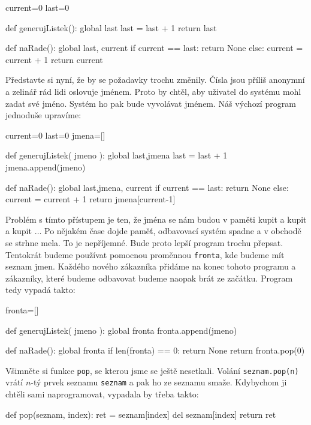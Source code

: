 \begin{python}
current=0
last=0

def generujListek():
    global last
    last = last + 1
    return last
    
def naRade():
    global last, current
    if current == last:
        return None
    else:
        current = current + 1
    return current
\end{python}

Představte si nyní, že by se požadavky trochu změnily. Čísla jsou příliš anonymní a zelinář rád lidi oslovuje jménem. Proto by chtěl,
aby uživatel do systému mohl zadat své jméno. Systém ho pak bude vyvolávat jménem. Náš výchozí program jednoduše upravíme:

\begin{python}
current=0
last=0
jmena=[]

def generujListek( jmeno ):
    global last,jmena
    last = last + 1
    jmena.append(jmeno)
    
def naRade():
    global last,jmena, current
    if current == last:
        return None
    else:
        current = current + 1
    return jmena[current-1]
\end{python}

Problém s tímto přístupem je ten, že jména se nám budou v paměti kupit a kupit a kupit $\ldots$ Po nějakém čase dojde paměť, odbavovací systém spadne a 
v obchodě se strhne mela. To je nepříjemné. Bude proto lepší program trochu přepsat. Tentokrát budeme používat pomocnou proměnnou {\tt fronta}, kde
budeme mít seznam jmen. Každého nového zákazníka přidáme na konec tohoto programu a zákazníky, které budeme odbavovat budeme naopak brát ze začátku.
Program tedy vypadá takto:

\begin{python}
fronta=[]

def generujListek( jmeno ):
    global fronta
    fronta.append(jmeno)
    
def naRade():
    global fronta
    if len(fronta) == 0:
        return None
    return fronta.pop(0)
\end{python}

Všimněte si funkce {\tt pop}, se kterou jsme se ještě nesetkali. Volání {\tt seznam.pop(n)} vrátí $n$-tý prvek seznamu {\tt seznam}
a pak ho ze seznamu smaže. Kdybychom ji chtěli sami naprogramovat, vypadala by třeba takto:

\begin{python}
def pop(seznam, index):
    ret = seznam[index]
    del seznam[index]
    return ret
\end{python}

